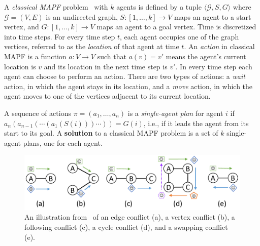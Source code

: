 \documentclass[review]{elsarticle}
\newcommand{\target}{\ensuremath{G}\xspace}
\newcommand{\source}{\ensuremath{S}\xspace}
\newcommand\konstantin[1]{\nb{\textbf{Konstantin:}}{red}{#1}}
\newcommand\roni[1]{\nb{\textbf{Roni:}}{green}{#1}}
\newcommand\dor[1]{\nb{\textbf{Dor:}}{Fuchsia}{#1}}
\begin{document}
A \emph{classical MAPF} problem~\cite{stern2019mapf} with $k$ agents is defined by 
a tuple $\langle \mathcal{G}, \source,\target \rangle$ 
where $\mathcal{G}=(V,E)$ is an undirected graph, 
$\source:[1,\ldots,k]\rightarrow V$ maps an agent to a start vertex, 
and $\target:[1,\ldots,k]\rightarrow V$ maps an agent to a goal vertex. 
Time is discretized into time steps. 
For every time step $t$, each agent occupies one of the graph vertices, referred to as the \emph{location} of that agent at time $t$.
An \emph{action} in classical MAPF is a function $a: V\rightarrow V$ 
such that $a(v)=v'$ means the agent's current location is $v$ and its location in the next time step is $v'$. %
In every time step each agent can choose to perform an action. 
There are two types of actions: a \emph{wait} action, in which the agent stays in its location, and a \emph{move} action, in which the agent moves to one of the vertices adjacent to its current location. 




A sequence of actions $\pi=(a_1,\ldots,a_n)$ 
is a \emph{single-agent plan} for agent $i$ 
if $a_n(a_{n-1}(\cdots(a_1(\source(i)))\cdots))=\target(i)$, i.e., if it leads the agent from its start to its goal. A \textbf{solution} to a classical MAPF problem is a set of $k$ single-agent plans, one for each agent.  



\begin{figure}
    \centering
    \includegraphics[width=\columnwidth]{types-of-conflicts.pdf}
    \caption{An illustration from~\cite{stern2019mapf} of an edge conflict (a), a vertex conflict (b), a following conflict (c), a cycle conflict (d), and a swapping conflict (e).}
    \label{fig:types-of-conflicts}
\end{figure}
\end{document}
